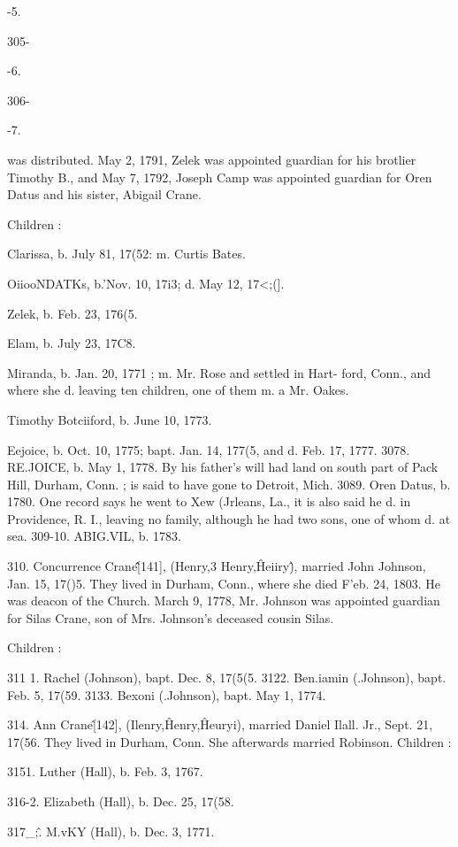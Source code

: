 -5. 


305- 


-6. 


306- 


-7. 




was distributed. May 2, 1791, Zelek was appointed guardian 
for his brotlier Timothy B., and May 7, 1792, Joseph Camp was 
appointed guardian for Oren Datus and his sister, Abigail Crane. 

Children : 

Clarissa, b. July 81, 17(52: m. Curtis Bates. 

OiiooNDATKs, b.'Nov. 10, 17i3; d. May 12, 17<;(]. 

Zelek, b. Feb. 23, 176(5. 

Elam, b. July 23, 17C8. 

Miranda, b. Jan. 20, 1771 ; m. Mr. Rose and settled in Hart- 
ford, Conn., and where she d. leaving ten children, one of 
them m. a Mr. Oakes. 

Timothy Botciiford, b. June 10, 1773. 

Eejoice, b. Oct. 10, 1775; bapt. Jan. 14, 177(5, and d. Feb. 
17, 1777. 
3078. RE.JOICE, b. May 1, 1778. By his father's will had land on 
south part of Pack Hill, Durham, Conn. ; is said to have 
gone to Detroit, Mich. 
3089. Oren Datus, b. 1780. One record says he went to Xew 
(Jrleans, La., it is also said he d. in Providence, R. I., 
leaving no family, although he had two sons, one of whom 
d. at sea. 
309-10. ABIG.VIL, b. 1783. 

310. Concurrence Crane\^\^ [141], (Henry,3 Henry,\^ Heiiry\^), 
married John Johnson, Jan. 15, 17()5. They lived in Durham, 
Conn., where she died F'eb. 24, 1803. He was deacon of the 
Church. March 9, 1778, Mr. Johnson was appointed guardian 
for Silas Crane, son of Mrs. Johnson's deceased cousin Silas. 

Children : 

311  1. Rachel (Johnson), bapt. Dec. 8, 17(5(5. 
3122. Ben.iamin (.Johnson), bapt. Feb. 5, 17(59. 
3133. Bexoni (.Johnson), bapt. May 1, 1774. 

314. Ann Crane\^ [142], (Ilenry,\^ Henry,\^ Heuryi), married 
Daniel Ilall. Jr., Sept. 21, 17(56. They lived in Durham, Conn. 
She afterwards married Robinson. Children : 

3151. Luther (Hall), b. Feb. 3, 1767. 

316-2. Elizabeth (Hall), b. Dec. 25, 17(58. 

317\_;\^. M.vKY (Hall), b. Dec. 3, 1771. 

